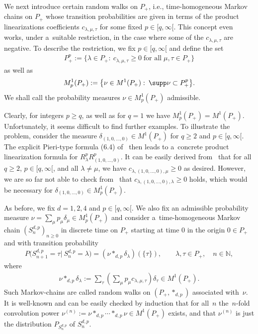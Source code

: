 We next introduce certain random walks on $P_+$, i.e., time-homogeneous Markov chains on $P_+$ whose transition
probabilities are given in terms of the product linearizations coef\/f\/icients $c_{\lambda,\mu,\tau}$ for some f\/ixed
$p\in[q,\infty[$.
This concept even works, under a~suitable restriction, in the case where some of the $c_{\lambda,\mu,\tau}$ are negative.
To describe the restriction, we f\/ix $p\in[q,\infty[$ and def\/ine the set
\begin{gather*}
P_+^p:=\{\lambda\in P_+:\> c_{\lambda,\mu,\tau}\ge0
\;
\text{for all}
\;
\mu,\tau\in P_+\}
\end{gather*}
as well as
\begin{gather*}
M^1_p(P_+):=\big\{\nu\in M^1(P_+):\> \supp \nu\subset P_+^p\big\}.
\end{gather*}
We shall call the probability measures $\nu\in M^1_p(P_+)$ admissible.

Clearly, for integers $p\ge q$, as well as for $q=1$ we have $M^1_p(P_+)=M^1(P_+)$.
Unfortunately, it seems dif\/f\/icult to f\/ind further examples.
To illustrate the problem, consider the measure $\delta_{(1,0,\ldots,0)}\in M^1(P_+)$ for $q\ge 2$ and $p\in[q,\infty[$.
The explicit Pieri-type formula (6.4) of~\cite{D} then leads to a~concrete product linearization formula for
$R_\lambda^p  R_{(1,0,\ldots,0)}^p$.
It can be easily derived from~\cite{D} that for all $q\ge 2$, $p\in[q,\infty[$, and all $\lambda\ne \mu$, we have
$c_{\lambda,(1,0,\ldots,0), \mu}\ge0$ as desired.
However, we are so far not able to check from~\cite{D} that $c_{\lambda,(1,0,\ldots,0), \lambda}\ge0$ holds, which would
be necessary for $\delta_{(1,0,\ldots,0)}\in M^1_p(P_+)$.

As before, we f\/ix $d=1,2,4$ and $p\in [q,\infty[$.
We also f\/ix an admissible probability measure $\nu=\sum\limits_\mu p_\mu\delta_\mu\in M^1_p(P_+)$ and consider
a~time-homogeneous Markov chain $(S_n^{d,p})_{n\ge0}$ in discrete time on $P_+$ starting at time $0$ in the origin $0\in
P_+$ and with transition probability
\begin{gather*}
P\big(S_{n+1}^{d,p}=\tau|\> S_n^{d,p}
=\lambda\big)=(\nu*_{d,p}\delta_\lambda)(\{\tau\}),
\qquad
\lambda,\tau\in P_+,
\quad
n\in\mathbb N,
\end{gather*}
where
\begin{gather*}
\nu*_{d,p}\delta_\lambda:= \sum\limits_\tau \left(\sum\limits_\mu p_\mu c_{\lambda,\mu,\tau}\right) \delta_\tau\in M^1(P_+).
\end{gather*}
Such Markov-chains are called random walks on $(P_+,*_{d,p})$ associated with~$\nu$.
It is well-known and can be easily checked by induction that for all~$n$ the~$n$-fold convolution power
$\nu^{(n)}:=\nu*_{d,p}\cdots *_{d,p}\nu\in M^1(P_+)$ exists, and that $\nu^{(n)}$ is just the distribution
$P_{S_n^{d,p}}$ of $S_n^{d,p}$.

